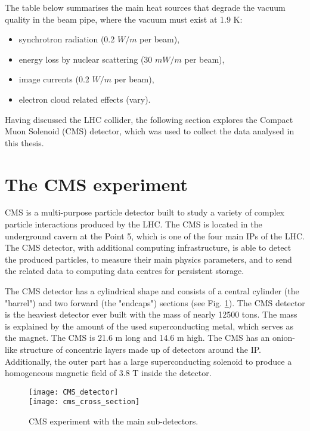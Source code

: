 \begin{normalsize}
The table below summarises the main heat sources that degrade the vacuum quality in the beam pipe, where the vacuum must exist at 1.9 K:


\begin{itemize}
\item synchrotron radiation (0.2 $W/m$ per beam),
\item energy loss by nuclear scattering (30 $mW/m$ per beam),
\item image currents (0.2 $W/m$ per beam),
\item electron cloud related effects (vary).
\end{itemize}



Having discussed the LHC collider, the following section explores the Compact Muon Solenoid (CMS) detector, which was used to collect the data analysed in this thesis. 


\section{The CMS experiment}

CMS is a multi-purpose particle detector built to study a variety of complex particle interactions produced by the LHC. The CMS is located in the underground cavern at the Point 5, which is one of the four main IPs of the LHC. The CMS detector, with additional computing infrastructure, is able to detect the produced particles, to measure their main physics parameters, and to send the related data to computing data centres for persistent storage. 


The CMS detector has a cylindrical shape and consists of a central cylinder (the "barrel") and two forward (the "endcaps") sections (see Fig. \ref{CMS_detector}). 
The CMS detector is the heaviest detector ever built with the mass of nearly 12500 tons. The mass is explained by the amount of the used superconducting metal, which serves as the magnet. The CMS is 21.6 m long and 14.6 m high. The CMS has an onion-like structure of concentric layers made up of detectors around the IP. Additionally, the outer part has a large superconducting solenoid to produce a homogeneous magnetic field of 3.8 T inside the detector.

\begin{figure}[H]
  \centering
  \texttt{[image: CMS\_detector]}\\
  \vspace{1cm}
  \texttt{[image: cms\_cross\_section]}
  \caption{CMS experiment with the main sub-detectors.}
  \label{CMS_detector}
\end{figure}



\end{normalsize}
